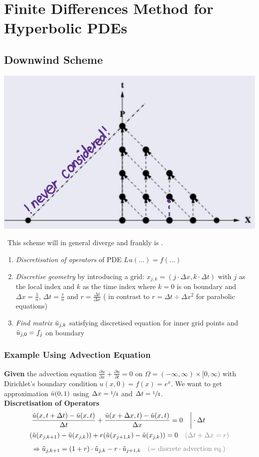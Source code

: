 \section{Finite Differences Method for Hyperbolic PDEs}

\subsection{Downwind Scheme}

\includegraphics[width=0.3\columnwidth]{images/downwind_scheme}

{\color{orange}\faWarning\ This scheme will in general diverge and frankly is \faTrash.}

\begin{enumerate}
	\item \emph{Discretisation of operators} of PDE $Lu(...)=f(...)$
	\item{
		\emph{Discretise geometry} by introducing a grid:
		$x_{j,k} = (j\cdot\Delta x, k\cdot\Delta t)$ with $j$ as the local index
		and $k$ as the time index where $k=0$ is on boundary
		and \colorbox{shadecolor}{$\Delta x = \frac{1}{n}$},
		\colorbox{shadecolor}{$\Delta t = \frac{r}{n}$}
		and \colorbox{shadecolor}{$r = \frac{\Delta t}{\Delta x}$} 
		({\color{orange}\faWarning} in contrast to $r=\Delta t\div\Delta x^2$ for parabolic equations)
	}
	\item{
		\emph{Find matrix $\tilde{u}_{j,k}$} satisfying discretised equation for inner grid points
		and $\tilde{u}_{j,0}=f_j$ on boundary
	}
\end{enumerate}

\subsubsection{Example Using Advection Equation}

\textbf{Given} the advection equation 
$\frac{\partial u}{\partial x} + \frac{\partial u}{\partial t} = 0$ on
$\Omega = (-\infty,\infty)\times[0,\infty)$ with Dirichlet's boundary condition
$u(x,0) = f(x) = e^x$. We want to get approximation $\tilde{u}(0,1)$ using
$\Delta x = \sfrac{1}{4}$ and $\Delta t = \sfrac{1}{4}$.
\\[1em]
\textbf{Discretisation of Operators}
\begin{align*}
	& \left.{\frac{\utild(x,t+\Delta t)-\utild(x,t)}{\Delta t}}
	+ {\frac{\utild(x+\Delta x,t)-\utild(x,t)}{\Delta x}} = 0\quad\right|\cdot \Delta t \\
	& (\utild(x_{j,k+1})-\utild(x_{j,k}))+r(\utild(x_{j+1,k})-\utild(x_{j,k}))=0
	{\color{gray} \quad(\Delta t\div\Delta x = r)}
\end{align*}
\begin{align*}
	\Rightarrow \utild_{j,k+1}
	= \left(1+r\right)\cdot\utild_{j,k}-r\cdot\utild_{j+1,k}
	{\color{gray}\quad\text{(= discrete advection eq.)}}
\end{align*}

